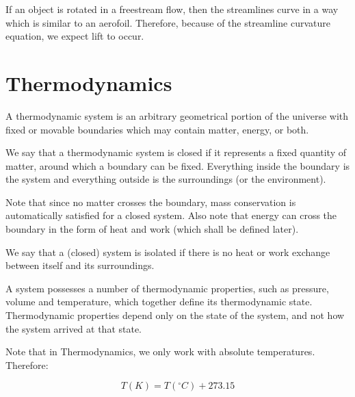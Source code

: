 \documentclass{article}
\begin{document}
\begin{proposition}
    If an object is rotated in a freestream flow, then the streamlines curve in a way which is similar to an aerofoil. Therefore, because of the streamline curvature equation, we expect lift to occur.
\end{proposition}

\newpage

\section{Thermodynamics}

\begin{definition}
    A thermodynamic system is an arbitrary geometrical portion of the universe with fixed or movable boundaries which may contain matter, energy, or both.

    We say that a thermodynamic system is closed if it represents a fixed quantity of matter, around which a boundary can be fixed. Everything inside the boundary is the system and everything outside is the surroundings (or the environment).

    Note that since no matter crosses the boundary, mass conservation is automatically satisfied for a closed system. Also note that energy can cross the boundary in the form of heat and work (which shall be defined later).
\end{definition}

\begin{definition}
    We say that a (closed) system is isolated if there is no heat or work exchange between itself and its surroundings.
\end{definition}

\begin{definition}
    A system possesses a number of thermodynamic properties, such as pressure, volume and temperature, which together define its thermodynamic state. Thermodynamic properties depend only on the state of the system, and not how the system arrived at that state.
\end{definition}

\begin{proposition}
    Note that in Thermodynamics, we only work with absolute temperatures. Therefore:

    \[ T(K) = T(^\circ C) + 273.15 \]
\end{proposition}
\end{document}

